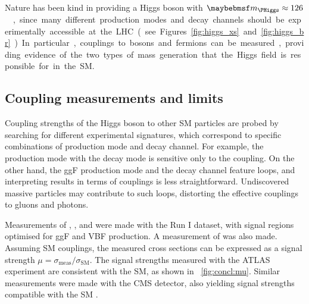 Nature has been kind in providing a Higgs boson with \unit{$\mH \approx 126$}{\GeV}, 
since many different production modes and decay channels should be experimentally 
accessible at the LHC (see Figures~\ref{fig:higgs_xs} and \ref{fig:higgs_br}). In 
particular, couplings to bosons and fermions can be measured, providing evidence of the 
two types of mass generation that the Higgs field is responsible for in the SM.



\subsection{Coupling measurements and limits}
\label{sec:searches:couplings}

Coupling strengths of the Higgs boson to other SM particles are probed by searching for 
different experimental signatures, which correspond to specific combinations of 
production mode and decay channel. For example, the \WH production mode with the \HWW 
decay mode is sensitive only to the \HepProcess{\PHiggs\PW\PW} coupling. On the other 
hand, the ggF production mode and the \HepProcess{\PHiggs \HepTo \Pphoton\Pphoton} decay 
channel feature loops, and interpreting results in terms of couplings is less 
straightforward. Undiscovered massive particles may contribute to such loops, distorting 
the effective couplings to gluons and photons.

Measurements of \HepProcess{\PHiggs \HepTo \Pphoton\Pphoton}, \HepProcess{\PHiggs \HepTo 
\PZ\PZ}, \HWW and \HepProcess{\PHiggs \HepTo \Ptau\Ptau} were made with the Run I 
dataset, with signal regions optimised for ggF and VBF production. A measurement of 
\HepProcess{\PV\PHiggs \HepTo \PV\Pbottom\APbottom} was also made. Assuming SM couplings, 
the measured cross sections can be expressed as a signal strength $\mu = 
\sigma_{\text{meas}} / \sigma_{\text{SM}}$. The signal strengths measured with the ATLAS 
experiment are consistent with the SM, as shown in \Figure~\ref{fig:concl:mu}.
Similar measurements were made with the CMS detector, also yielding signal strengths 
compatible with the SM \cite{CMS:Hgamgam,CMS:HZZ,CMS:HWW,CMS:Htautau,CMS:Hbb}.

